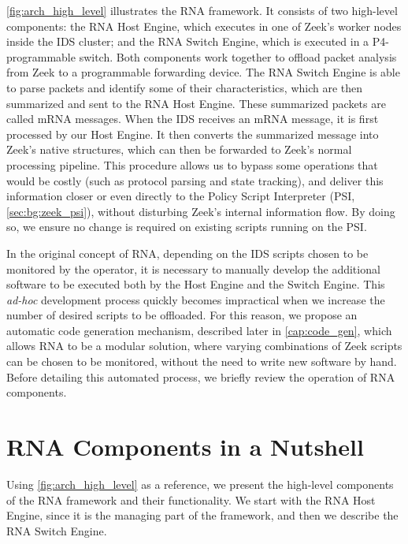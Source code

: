 \autoref{fig:arch_high_level} illustrates the RNA framework. It consists of two high-level components: the RNA Host Engine, which executes in one of Zeek's worker nodes inside the IDS cluster; and the RNA Switch Engine, which is executed in a P4-programmable switch. Both components work together to offload packet analysis from Zeek to a programmable forwarding device. The RNA Switch Engine is able to parse packets and identify some of their characteristics, which are then summarized and sent to the RNA Host Engine. These summarized packets are called mRNA messages. When the IDS receives an mRNA message, it is first processed by our Host Engine. It then converts the summarized message into Zeek's native structures, which can then be forwarded to Zeek's normal processing pipeline. This procedure allows us to bypass some operations that would be costly (such as protocol parsing and state tracking), and deliver this information closer or even directly to the Policy Script Interpreter (PSI, \autoref{sec:bg:zeek_psi}), without disturbing Zeek's internal information flow. By doing so, we ensure no change is required on existing scripts running on the PSI.

In the original concept of RNA, depending on the IDS scripts chosen to be monitored by the operator, it is necessary to manually develop the additional software to be executed both by the Host Engine and the Switch Engine. This \textit{ad-hoc} development process quickly becomes impractical when we increase the number of desired scripts to be offloaded. For this reason, we propose an automatic code generation mechanism, described later in \autoref{cap:code_gen}, which allows RNA to be a modular solution, where varying combinations of Zeek scripts can be chosen to be monitored, without the need to write new software by hand. Before detailing this automated process, we briefly review the operation of RNA components.

\section{RNA Components in a Nutshell}
\label{sec:rna:overview}

Using \autoref{fig:arch_high_level} as a reference, we present the high-level components of the RNA framework and their functionality. We start with the RNA Host Engine, since it is the managing part of the framework, and then we describe the RNA Switch Engine.

